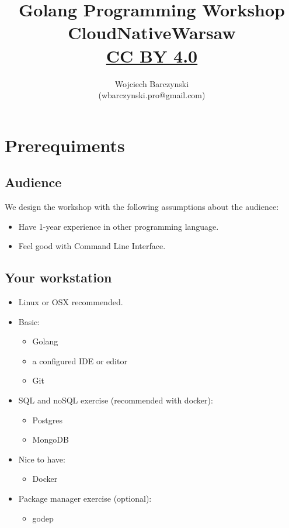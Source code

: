 \documentclass[11pt, letterpaper]{article}
\title{Golang Programming Workshop\\CloudNativeWarsaw\\{ \small \href{https://creativecommons.org/licenses/by/4.0/}{CC BY 4.0} }  }
\author{Wojciech Barczynski\\(wbarczynski.pro@gmail.com)}
\date{}
\begin{document}

\begin{titlepage}
\maketitle
\end{titlepage}

\tableofcontents
\pagebreak
\section{Prerequiments}

\subsection{Audience}

We design the workshop with the following assumptions about the audience:

\begin{itemize}%
\item Have 1-year experience in other programming language.%
\item Feel good with Command Line Interface.
\end{itemize}%

\subsection{Your workstation}

\begin{itemize}%
\item Linux or OSX recommended.%
\item Basic: \begin{itemize}%
    \item Golang
    \item a configured IDE or editor
    \item Git
    \end{itemize}%
\item {\small SQL} and no{\small SQL} exercise (recommended with docker):
\begin{itemize}%
    \item Postgres
    \item MongoDB
\end{itemize}
\item Nice to have: \begin{itemize}%
    \item Docker
    \end{itemize}
\item Package manager exercise (optional):
\begin{itemize}%
    \item godep
\end{itemize}  
\end{itemize}
\end{document}
